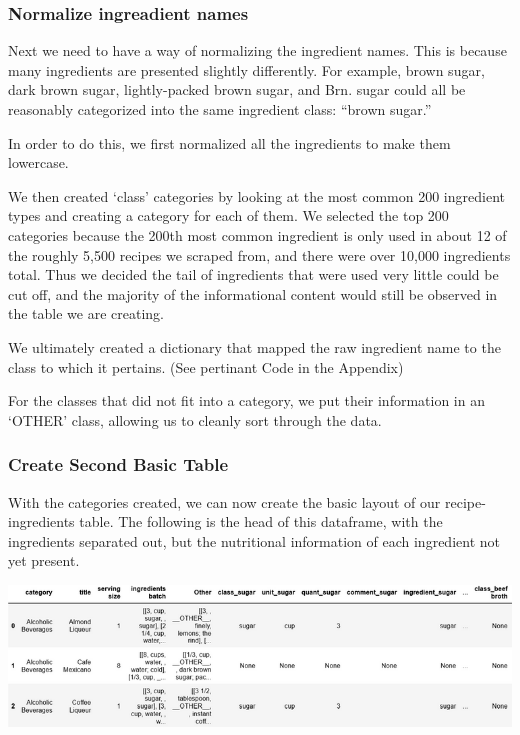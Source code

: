 \documentclass[11pt]{article}
\makeatletter
\def\maxwidth{\ifdim\Gin@nat@width>\linewidth\linewidth
    \else\Gin@nat@width\fi}
\let\Oldincludegraphics\includegraphics
\renewcommand{\includegraphics}[1]{\Oldincludegraphics[width=.8\maxwidth]{#1}}
\makeatother
\begin{document}
\hypertarget{normalize-ingreadient-names}{%
\subsubsection{Normalize ingreadient
names}\label{normalize-ingreadient-names}}

Next we need to have a way of normalizing the ingredient names. This is
because many ingredients are presented slightly differently. For
example, brown sugar, dark brown sugar, lightly-packed brown sugar, and
Brn. sugar could all be reasonably categorized into the same ingredient
class: ``brown sugar.''

In order to do this, we first normalized all the ingredients to make
them lowercase.

We then created `class' categories by looking at the most common 200
ingredient types and creating a category for each of them. We selected
the top 200 categories because the 200th most common ingredient is only
used in about 12 of the roughly 5,500 recipes we scraped from, and there
were over 10,000 ingredients total. Thus we decided the tail of
ingredients that were used very little could be cut off, and the
majority of the informational content would still be observed in the
table we are creating.

We ultimately created a dictionary that mapped the raw ingredient name
to the class to which it pertains. (See pertinant Code in the Appendix)

For the classes that did not fit into a category, we put their
information in an `OTHER' class, allowing us to cleanly sort through the
data.

    \hypertarget{create-second-basic-table}{%
\subsubsection{Create Second Basic
Table}\label{create-second-basic-table}}

With the categories created, we can now create the basic layout of our
recipe-ingredients table. The following is the head of this dataframe,
with the ingredients separated out, but the nutritional information of
each ingredient not yet present.

\includegraphics{sorted_dataframe_head.png}
\end{document}
